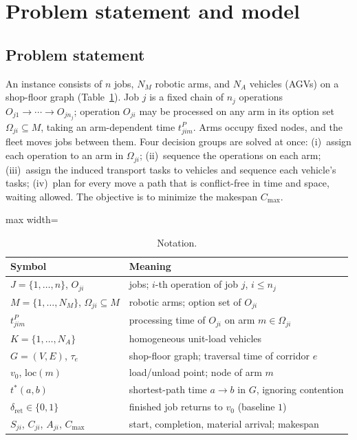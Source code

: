 \documentclass[preprint,review,12pt,authoryear]{elsarticle}
\begin{document}
\section{Problem statement and model}
\label{sec:Chapter_III}
\subsection{Problem statement}

An instance consists of $n$ jobs, $N_M$ robotic arms, and $N_A$ vehicles (AGVs) on a shop-floor graph (Table~\ref{tab:notation}).
Job $j$ is a fixed chain of $n_j$ operations $O_{j1}\to\cdots\to O_{jn_j}$; operation $O_{ji}$ may be processed on any arm in its option set $\Omega_{ji}\subseteq M$, taking an arm-dependent time $t^P_{jim}$.
Arms occupy fixed nodes, and the fleet moves jobs between them.
Four decision groups are solved at once:
(i)~assign each operation to an arm in $\Omega_{ji}$;
(ii)~sequence the operations on each arm;
(iii)~assign the induced transport tasks to vehicles and sequence each vehicle's tasks;
(iv)~plan for every move a path that is conflict-free in time and space, waiting allowed.
The objective is to minimize the makespan $C_{\max}$.

\begin{table}[!htbp]
\caption{Notation.}
\label{tab:notation}
\footnotesize
\begin{adjustbox}{max width=\linewidth}\begin{tabular}{@{}ll@{}}
\toprule
Symbol & Meaning \\
\midrule
$J=\{1,\dots,n\}$, $O_{ji}$ & jobs; $i$-th operation of job $j$, $i\le n_j$ \\
$M=\{1,\dots,N_M\}$, $\Omega_{ji}\subseteq M$ & robotic arms; option set of $O_{ji}$ \\
$t^P_{jim}$ & processing time of $O_{ji}$ on arm $m\in\Omega_{ji}$ \\
$K=\{1,\dots,N_A\}$ & homogeneous unit-load vehicles \\
$G=(V,E)$, $\tau_e$ & shop-floor graph; traversal time of corridor $e$ \\
$v_0$, $\mathrm{loc}(m)$ & load/unload point; node of arm $m$ \\
$t^{*}(a,b)$ & shortest-path time $a\to b$ in $G$, ignoring contention \\
$\delta_{\mathrm{ret}}\in\{0,1\}$ & finished job returns to $v_0$ (baseline $1$) \\
$S_{ji}$, $C_{ji}$, $A_{ji}$, $C_{\max}$ & start, completion, material arrival; makespan \\
\bottomrule
\end{tabular}\end{adjustbox}
\end{table}
\end{document}
